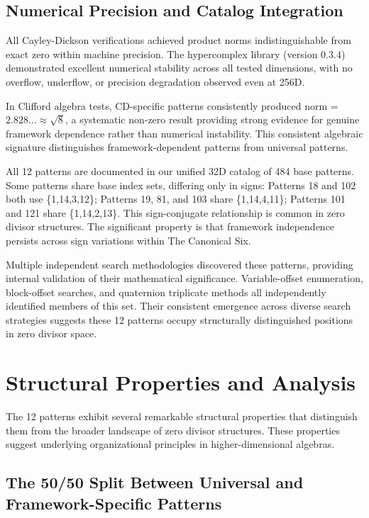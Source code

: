 \documentclass[11pt]{article}
\begin{document}
\subsection{Numerical Precision and Catalog Integration}

All Cayley-Dickson verifications achieved product norms indistinguishable from exact zero within machine precision. The hypercomplex library (version 0.3.4) demonstrated excellent numerical stability across all tested dimensions, with no overflow, underflow, or precision degradation observed even at 256D.

In Clifford algebra tests, CD-specific patterns consistently produced norm = $2.828... \approx \sqrt{8}$, a systematic non-zero result providing strong evidence for genuine framework dependence rather than numerical instability. This consistent algebraic signature distinguishes framework-dependent patterns from universal patterns.

All 12 patterns are documented in our unified 32D catalog of 484 base patterns. Some patterns share base index sets, differing only in signs: Patterns 18 and 102 both use \{1,14,3,12\}; Patterns 19, 81, and 103 share \{1,14,4,11\}; Patterns 101 and 121 share \{1,14,2,13\}. This sign-conjugate relationship is common in zero divisor structures. The significant property is that framework independence persists across sign variations within The Canonical Six.

Multiple independent search methodologies discovered these patterns, providing internal validation of their mathematical significance. Variable-offset enumeration, block-offset searches, and quaternion triplicate methods all independently identified members of this set. Their consistent emergence across diverse search strategies suggests these 12 patterns occupy structurally distinguished positions in zero divisor space.

\section{Structural Properties and Analysis}
\label{sec:properties}

The 12 patterns exhibit several remarkable structural properties that distinguish them from the broader landscape of zero divisor structures. These properties suggest underlying organizational principles in higher-dimensional algebras.

\subsection{The 50/50 Split Between Universal and Framework-Specific Patterns}
\end{document}
